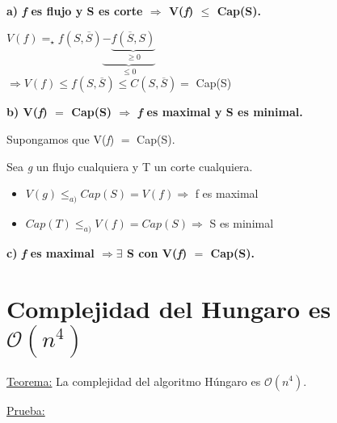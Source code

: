 \documentclass[12pt,a4paper]{report}
\begin{document}
		\textbf{a) \textit{f} es flujo y S es corte $\Rightarrow$ V(\textit{f}) $\leq$ Cap(S).}
		
			\begin{center}
				$V(f) =_{\star} f(S, \overline{S})\underbrace{-\underbrace{f(\overline{S}, S)}_{\geq 0}}_{\leq 0}$ \\
				\vspace{5mm}
				$\Rightarrow V(f ) \leq f(S, \overline{S}) \leq C(S, \overline{S}) =$ Cap(S)
			\end{center}
			
		\textbf{b) V(\textit{f}) $=$ Cap(S) $\Rightarrow$ \textit{f} es maximal y S es minimal.}

			\vspace{5mm}
			Supongamos que V(\textit{f}) $=$ Cap(S).
			
			Sea \textit{g} un flujo cualquiera y T un corte cualquiera.
			\begin{itemize}
				\item $V(g) \leq_{a)} Cap(S) = V(f) \Rightarrow$ f es maximal 
				\item $Cap(T) \leq_{a)} V(f) = Cap(S) \Rightarrow$ S es minimal
			\end{itemize}
			
		\textbf{c) \textit{f} es maximal $\Rightarrow \exists$ S con V(\textit{f}) $=$ Cap(S).}
		
		\vspace{5mm}
		
		
		
	\section{Complejidad del Hungaro es $\mathcal{O}(n^{4})$}
	
		\underline{Teorema:} La complejidad del algoritmo Húngaro es $\mathcal{O}(n^{4})$.
		
		\underline{Prueba:} 
		
\end{document}

